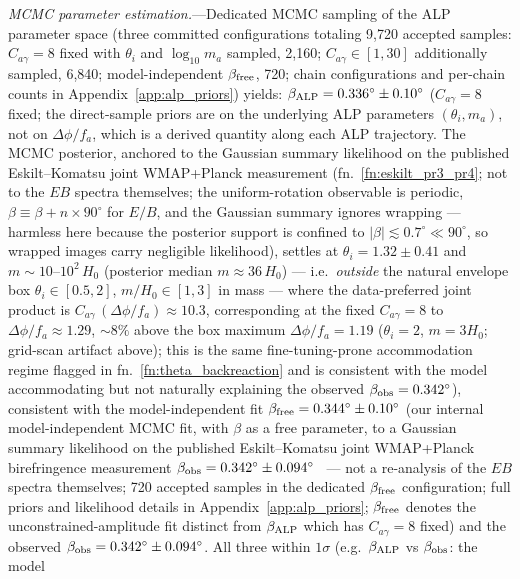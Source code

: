 \documentclass[aps,prd,twocolumn,superscriptaddress,showpacs,preprintnumbers,nofootinbib,longbibliography,floatfix]{revtex4-2}
\begin{document}
\textit{MCMC parameter estimation.}---Dedicated MCMC sampling of the ALP parameter
space (three committed configurations totaling 9{,}720 accepted samples:
$C_{a\gamma}=8$ fixed with $\theta_i$ and $\log_{10}m_a$ sampled, 2{,}160;
$C_{a\gamma}\in[1,30]$ additionally sampled, 6{,}840; model-independent
$\beta_{\rm free}$, 720; chain configurations and per-chain counts in
Appendix~\ref{app:alp_priors}) yields:
$\beta_{\rm ALP} = 0.336^\circ\pm 0.10^\circ$ ($C_{a\gamma}=8$ fixed; the
direct-sample priors are on the underlying ALP parameters $(\theta_i, m_a)$,
not on $\Delta\phi/f_a$, which is a derived quantity along each ALP trajectory.
The MCMC posterior, anchored to the
Gaussian summary likelihood on the published Eskilt--Komatsu joint
WMAP+Planck measurement (fn.~\ref{fn:eskilt_pr3_pr4}; not to the $EB$
spectra themselves; the uniform-rotation observable is periodic,
$\beta \equiv \beta + n\times 90^\circ$ for $E/B$, and the Gaussian
summary ignores wrapping --- harmless here because the posterior support
is confined to $|\beta| \lesssim 0.7^\circ \ll 90^\circ$, so wrapped
images carry negligible likelihood), settles at $\theta_i = 1.32 \pm 0.41$ and
$m \sim 10$--$10^2\,H_0$ (posterior median $m \approx 36\,H_0$) --- i.e.\
\emph{outside} the natural envelope box $\theta_i\in[0.5,2]$,
$m/H_0\in[1,3]$ in mass --- where the data-preferred joint product is
$C_{a\gamma}\,(\Delta\phi/f_a)\approx 10.3$, corresponding at the fixed
$C_{a\gamma}=8$ to $\Delta\phi/f_a\approx 1.29$, ${\sim}8\%$ above the
box maximum $\Delta\phi/f_a = 1.19$ ($\theta_i=2$, $m=3H_0$; grid-scan
artifact above); this is the same fine-tuning-prone accommodation regime
flagged in fn.~\ref{fn:theta_backreaction}
and is consistent with the model accommodating but not naturally explaining
the observed $\beta_{\rm obs}=0.342^\circ$),
consistent with the model-independent fit $\beta_{\rm free} = 0.344^\circ\pm 0.10^\circ$ (our internal model-independent MCMC fit, with $\beta$ as a free parameter, to a Gaussian summary likelihood on the published Eskilt--Komatsu joint WMAP+Planck birefringence measurement $\beta_{\rm obs}=0.342^\circ\pm0.094^\circ$~\cite{Eskilt2022} --- not a re-analysis of the $EB$ spectra themselves; 720 accepted samples in the dedicated $\beta_{\rm free}$ configuration; full priors and likelihood details in Appendix~\ref{app:alp_priors}; $\beta_{\rm free}$ denotes the unconstrained-amplitude fit distinct from $\beta_{\rm ALP}$ which has $C_{a\gamma}=8$ fixed)
and the observed $\beta_{\rm obs} = 0.342^\circ\pm 0.094^\circ$. All three
within $1\sigma$ (e.g.\ $\beta_{\rm ALP}$ vs $\beta_{\rm obs}$: the model
\end{document}
